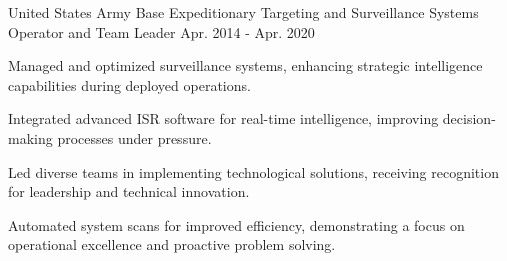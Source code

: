\begin{cventries}
  \cventry
    {United States Army} %
    {Base Expeditionary Targeting and Surveillance Systems Operator and Team Leader} %
    {} %
    {Apr. 2014 - Apr. 2020} %
    {
      \begin{cvitems} %
      \item {Managed and optimized surveillance systems, enhancing strategic intelligence capabilities during deployed operations.}
    \item {Integrated advanced ISR software for real-time intelligence, improving decision-making processes under pressure.}
    \item {Led diverse teams in implementing technological solutions, receiving recognition for leadership and technical innovation.}
    \item {Automated system scans for improved efficiency, demonstrating a focus on operational excellence and proactive problem solving.}
      \end{cvitems}
    }
\end{cventries}
